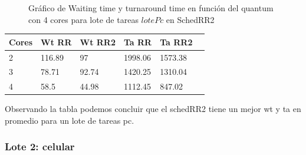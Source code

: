 \begin{figure}[H]
\hfill
{}
\hfill
{}
\hfill
\caption{Gráfico de Waiting time y turnaround time en función del quantum con 4 cores para lote de tareas $lotePc$ en SchedRR2}
\end{figure}

\begin{center}
    \begin{tabular}{ | l | l | l | l | l | p{5cm} |}
    \hline
    Cores & Wt RR & Wt RR2 & Ta RR & Ta RR2 \\ \hline
    2 & 116.89 & 97 & 1998.06 & 1573.38 \\ \hline
    3 & 78.71 & 92.74 & 1420.25 & 1310.04 \\ \hline
    4 & 58.5 & 44.98 & 1112.45 & 847.02 \\
	\hline
    \end{tabular}
\end{center}

Observando la tabla podemos concluir que el schedRR2 tiene un mejor wt y ta en promedio para un lote de tareas pc.

\subsubsection{Lote 2: celular}

